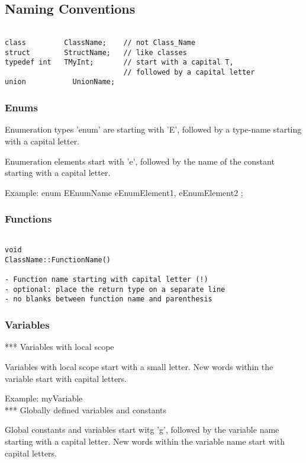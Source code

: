 \subsection{Naming Conventions}

\begin{verbatim}

class         ClassName;    // not Class_Name 
struct        StructName;   // like classes
typedef int   TMyInt;       // start with a capital T, 
                            // followed by a capital letter
union           UnionName;    

\end{verbatim}

\subsubsection{Enums}

Enumeration types 'enum' are starting with 'E', followed by a type-name starting with a capital letter.

Enumeration elements start with 'e', followed by the name of the constant starting with a capital letter.

Example:
enum EEnumName
{
    eEnumElement1,
    eEnumElement2
};

\subsubsection{Functions}
\begin{verbatim}

void 
ClassName::FunctionName()

- Function name starting with capital letter (!)
- optional: place the return type on a separate line 
- no blanks between function name and parenthesis

\end{verbatim}
\subsubsection{Variables}

*** Variables with local scope 

Variables with local scope start with a small letter. New words
within the variable start with capital letters.

Example: myVariable
\\

*** Globally defined variables and constants

Global constants and variables start witg 'g', followed by the
variable name starting with a capital letter. New words within the
variable name start with capital letters.
\\

